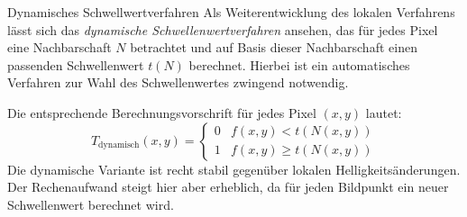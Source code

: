 \begin{defi}{Dynamisches Schwellwertverfahren}
    Als Weiterentwicklung des lokalen Verfahrens lässt sich das \emph{dynamische Schwellenwertverfahren} ansehen, das für jedes Pixel eine Nachbarschaft $N$ betrachtet und auf Basis dieser Nachbarschaft einen passenden Schwellenwert $t(N)$ berechnet.
    Hierbei ist ein automatisches Verfahren zur Wahl des Schwellenwertes zwingend notwendig.

    Die entsprechende Berechnungsvorschrift für jedes Pixel $(x,y)$ lautet:
    \[
        T_{\text{dynamisch}}(x, y) =
        \begin{cases}
            0 & f(x, y) < t(N(x, y))    \\
            1 & f(x, y) \geq t(N(x, y))
        \end{cases}
    \]
    Die dynamische Variante ist recht stabil gegenüber lokalen Helligkeitsänderungen.
    Der Rechenaufwand steigt hier aber erheblich, da für jeden Bildpunkt ein neuer Schwellenwert berechnet wird.
\end{defi}

